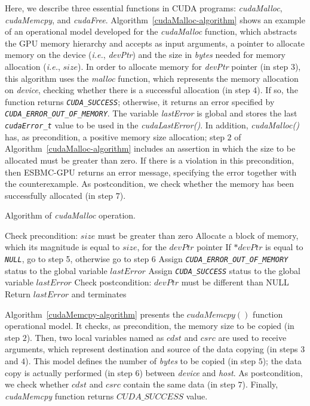 \documentclass[times, doublespace]{cpeauth}
\begin{document}
Here, we describe three essential functions in CUDA programs: \textit{cudaMalloc}, \textit{cudaMemcpy}, and \textit{cudaFree}. Algorithm~\ref{cudaMalloc-algorithm} shows an example of an operational model developed for the \textit{cudaMalloc} function, which abstracts the GPU memory hierarchy and accepts as input arguments, a pointer to allocate memory on the device ({\it i.e.}, \textit{devPtr}) and the size in \textit{bytes} needed for memory allocation (\textit{i.e.}, $size$). In order to allocate memory for \textit{devPtr} pointer (in step $3$), this algorithm uses the \textit{malloc} function, which represents the memory allocation on \textit{device}, checking whether there is a successful allocation (in step $4$). If so, the function returns \emph{\tt CUDA\_SUCCESS}; otherwise, it returns an error specified by \emph{\tt CUDA\_ERROR\_OUT\_OF\_MEMORY}. The variable \textit{lastError} is global and stores the last \emph{\tt cudaError\_t} value to be used in the \textit{cudaLastError()}. In addition, \textit{cudaMalloc()} has, as precondition, a positive memory size allocation; step $2$ of Algorithm~\ref{cudaMalloc-algorithm} includes an assertion in which the size to be allocated must be greater than zero. If there is a violation in this precondition, then ESBMC-GPU returns an error message, specifying the error together with the counterexample. As postcondition, we check whether the memory has been successfully allocated (in step $7$).
%
\begin{algorithm}
\caption{Algorithm of \textit{cudaMalloc} operation.}
\label{cudaMalloc-algorithm}
\begin{algorithmic}[1]
  \State Check precondition: $size$ must be greater than zero
  \State Allocate a block of memory, which its magnitude is equal to $size$, for the $devPtr$ pointer
  \State If $*devPtr$ is equal to \emph{ \tt NULL}, go to step 5, otherwise go to step 6
  \State Assign \emph{\tt CUDA\_ERROR\_OUT\_OF\_MEMORY} status to the global variable $lastError$
  \State Assign \emph{\tt CUDA\_SUCCESS} status to the global variable $lastError$
	\State Check postcondition: $devPtr$ must be different than NULL
  \State Return $lastError$ and terminates
  \EndFunction
\end{algorithmic}
\end{algorithm}

Algorithm~\ref{cudaMemcpy-algorithm} presents the $cudaMemcpy()$ function operational model. It checks, as precondition, the memory size to be copied (in step $2$). Then, two local variables named as $cdst$ and $csrc$ are used to receive arguments, which represent destination and source of the data copying (in steps $3$ and $4$). This model defines the number of \textit{bytes} to be copied (in step $5$); the data copy is actually performed (in step $6$) between \textit{device} and \textit{host}. As postcondition, we check whether $cdst$ and $csrc$ contain the same data (in step $7$). Finally, \textit{cudaMemcpy} function returns $CUDA\_SUCCESS$ value.
\end{document}

